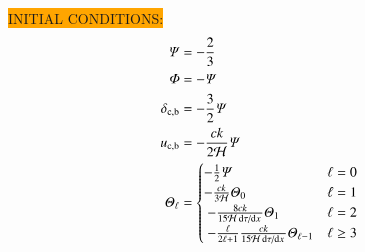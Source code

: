 


\noindent\colorbox{orange}{INITIAL CONDITIONS:}
\begin{subequations}\label{mil3:theo:eq:initial_conditions}
\begin{align}
    \Psi     &= -\frac{2}{3}     \label{mil3:theo:eq:init_Psi}\\
    \Phi     &= -\Psi         \label{mil3:theo:eq:init_Phi}\\
    \delta\ped{c, b}&= -\frac{3}{2} \Psi     \label{mil3:theo:eq:init_delta}\\
    u\ped{c, b}     &= -\frac{ck}{2\Hp} \Psi \label{mil3:theo:eq:init_u}\\
    \Theta_\ell &=\begin{cases}
        -\frac{1}{2}\Psi     & \ell = 0  \\
        -\frac{ck}{3\Hp} \Theta_0 & \ell = 1 \\ 
        -\frac{8ck}{15\Hp\dv*{\tau}{x}}\Theta_1    & \ell = 2 \\ 
        -\frac{\ell}{2\ell+1} \frac{ck}{15\Hp\dv*{\tau}{x}} \Theta_{\ell-1} &\ell \geq 3
    \end{cases} \label{mil3:theo:eq:init_Theta}
\end{align}
\end{subequations}


